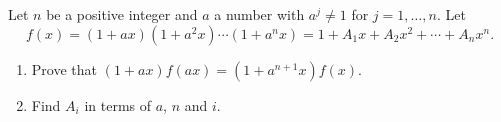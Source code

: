 Let $n$ be a positive integer and $a$ a number with $a^j\ne1$ for $j=1,\dots,n$. Let
\[
f(x)=(1+ax)\left(1+a^2x\right)\cdots\left(1+a^nx\right)=1+A_1x+A_2x^2+\cdots+A_nx^n .
\]
\begin{enumerate}
\item Prove that $(1+ax)f(ax)=\left(1+a^{n+1}x\right)f(x)$.
\item Find $A_i$ in terms of $a$, $n$ and $i$.
\end{enumerate}

